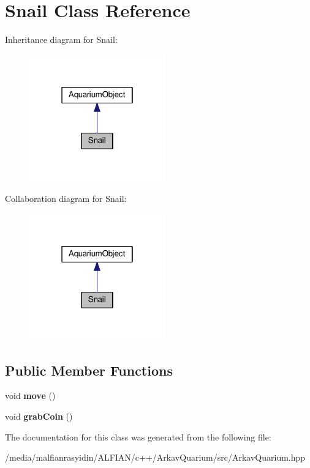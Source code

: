 \hypertarget{class_snail}{}\section{Snail Class Reference}
\label{class_snail}


Inheritance diagram for Snail\+:\nopagebreak
\begin{figure}[H]
\begin{center}
\leavevmode
\includegraphics[width=166pt]{class_snail__inherit__graph}
\end{center}
\end{figure}


Collaboration diagram for Snail\+:\nopagebreak
\begin{figure}[H]
\begin{center}
\leavevmode
\includegraphics[width=166pt]{class_snail__coll__graph}
\end{center}
\end{figure}
\subsection*{Public Member Functions}
\begin{DoxyCompactItemize}
\item 
\mbox{\label{class_snail_af5892ec122d9199480c813b74488256b}} 
void {\bfseries move} ()
\item 
\mbox{\label{class_snail_a877af082a9bc134a2cd2b4e97c94063d}} 
void {\bfseries grab\+Coin} ()
\end{DoxyCompactItemize}


The documentation for this class was generated from the following file\+:\begin{DoxyCompactItemize}
\item 
/media/malfianrasyidin/\+A\+L\+F\+I\+A\+N/c++/\+Arkav\+Quarium/src/Arkav\+Quarium.\+hpp\end{DoxyCompactItemize}
